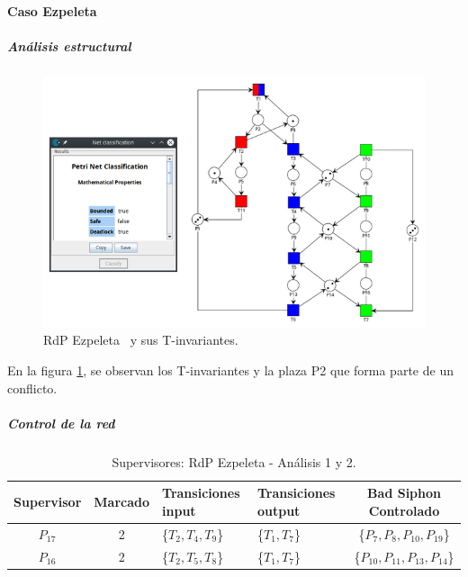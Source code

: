 \newpage
\paragraph{Caso Ezpeleta}
\subparagraph{Análisis estructural}
\hfill \break

\begin{figure}[H]
	\centering
	\includegraphics[width=\textwidth]{Figures/algoritmo4/ezpeleta_imag1.png}
	\caption[RdP Ezpeleta y sus T-invariantes.]{RdP Ezpeleta \footnotemark \ y sus T-invariantes.}
	\label{fig:Rdp-Ezpeletav4}
\end{figure} 
\bigskip

En la figura \ref{fig:Rdp-Ezpeletav4}, se observan los T-invariantes y la plaza P2 que forma parte de un conflicto.
\bigskip

\subparagraph{Control de la red}
\hfill \break 

\begin{table}[H]
    \small
    \centering
    \begin{tabular}{|c|c|P{2.2cm}|P{2.2cm}|c|}
    \hline
    \textbf{Supervisor} & \textbf{Marcado} & \textbf{Transiciones input} & \textbf{Transiciones output} & \textbf{Bad Siphon Controlado}  \\  \hline
    $P_{17}$ & 2 & \{$T_{2}, T_{4}, T_{9}$\} & \{$T_{1}, T_{7}$\} & \{$P_7,P_{8},P_{10},P_{19}$\} \\ 
    \hline
    $P_{16}$ & 2 & \{$T_{2}, T_{5}, T_{8}$\} & \{$T_{1}, T_{7}$\} & \{$P_{10},P_{11},P_{13},P_{14}$\} \\ 
    \hline
    \end{tabular}
    \caption{Supervisores: RdP Ezpeleta - Análisis 1 y 2.}
    \label{tab:Ezpeleta12-v4}
\end{table}

